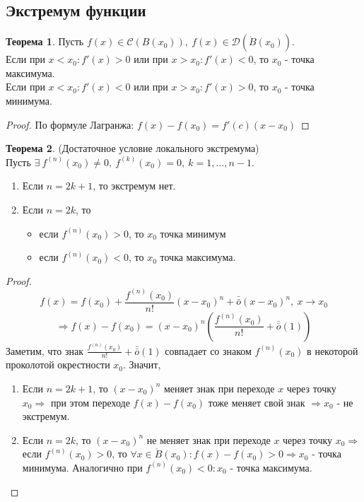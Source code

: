 \documentclass[a4paper, 12pt]{article}
\theoremstyle{definition}
\newtheorem*{theorem}{Теорема}
\begin{document}
        \subsection{Экстремум функции}
        \begin{theorem}
            Пусть $f(x)\in \mathcal{C}(B(x_0)),\ f(x)\in \mathcal{D}(\mathring{B}(x_0))$. \\
            Если при $x<x_0: f'(x)>0$ или при $x>x_0: f'(x)<0$, то $x_0$ - точка максимума.\\
            Если при $x<x_0: f'(x)<0$ или при $x>x_0: f'(x)>0$, то $x_0$ - точка минимума.
        \end{theorem} 
        \begin{proof}
            По формуле Лагранжа: $f(x)-f(x_0)=f'(c)(x-x_0)$
        \end{proof} 
        \begin{theorem} (Достаточное условие локального экстремума)\\
            Пусть $\exists\ f^{(n)}(x_0)\ne 0,\ f^{(k)}(x_0)=0,\ k=1, \dots, n-1$.
            \begin{enumerate}
                \item Если $n=2k+1$, то экстремум нет.
                \item Если $n=2k$, то
                \begin{itemize}
                    \item если $f^{(n)}(x_0)>0$, то $x_0$ точка минимум
                    \item если $f^{(n)}(x_0)<0$, то $x_0$ точка максимума.
                \end{itemize}
            \end{enumerate}
        \end{theorem} 
        \begin{proof}
            \[f(x)=f(x_0)+\frac{f^{(n)}(x_0)}{n!}(x-x_0)^n+\bar{\bar{o}}{(x-x_0)^n},\ x\to x_0\]
            \[\Rightarrow f(x)-f(x_0)=(x-x_0)^n(\frac{f^{(n)}(x_0)}{n!}+\bar{\bar{o}}{(1)})\]
            Заметим, что знак $\frac{f^{(n)}(x_0)}{n!}+\bar{\bar{o}}{(1)}$ совпадает со знаком $f^{(n)}(x_0)$ в некоторой проколотой окрестности $x_0$. Значит,
            \begin{enumerate}
                \item Если $n=2k+1$, то $(x-x_0)^n$ меняет знак при переходе $x$ через точку $x_0 \Rightarrow$ при этом переходе $f(x)-f(x_0)$ тоже меняет свой знак $\Rightarrow x_0$ - не экстремум.
                \item Если $n=2k$, то $(x-x_0)^n$ не меняет знак при переходе $x$ через точку $x_0 \Rightarrow$ если $f^{(n)}(x_0)>0$, то $\forall x \in \mathring{B}(x_0): f(x)-f(x_0)>0 \Rightarrow x_0$ - точка минимума. Аналогично при $f^{(n)}(x_0)<0: x_0$ - точка максимума.
            \end{enumerate}
            
        \end{proof} 
\end{document}
